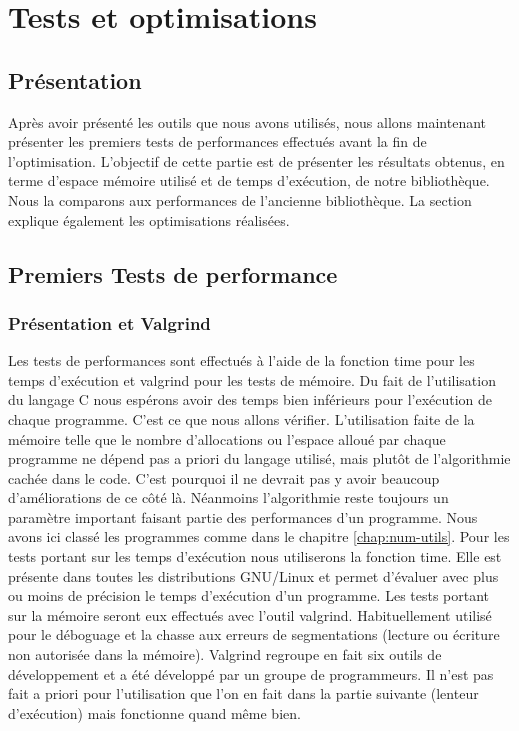 
\chapter{Tests et optimisations}
\label{chap:tests et optimisations}

\section{Pr\'esentation}

Apr\`es avoir pr\'esent\'e les outils que nous avons utilis\'es, nous allons maintenant pr\'esenter les premiers tests de performances effectu\'es 
avant la fin de l'optimisation.
L'objectif de cette partie est de pr\'esenter les r\'esultats obtenus, en terme d'espace m\'emoire utilis\'e et de temps d'ex\'ecution, de notre biblioth\`eque.
Nous la comparons aux performances de l'ancienne biblioth\`eque. La section explique \'egalement les optimisations r\'ealis\'ees.

\section{Premiers Tests de performance}

\subsection{Pr\'esentation et Valgrind}
Les tests de performances sont effectu\'es \`a l'aide de la fonction time pour les temps d'ex\'ecution et valgrind \citep{valgrind} pour les tests de m\'emoire.
Du fait de l'utilisation du langage C nous esp\'erons avoir des temps bien inf\'erieurs pour l'ex\'ecution de chaque programme. C'est ce que nous allons
 v\'erifier.
L'utilisation faite de la m\'emoire telle que le nombre d'allocations ou l'espace allou\'e par chaque programme ne d\'epend pas a priori du langage
 utilis\'e, mais plut\^ot de l'algorithmie cach\'ee dans le code. C'est pourquoi il ne devrait pas y avoir beaucoup d'am\'eliorations de ce c\^ot\'e l\`a.
N\'eanmoins l'algorithmie reste toujours un param\`etre important faisant partie des performances d'un programme.
Nous avons ici class\'e les programmes comme dans le chapitre \ref{chap:num-utils}.
Pour les tests portant sur les temps d'ex\'ecution nous utiliserons la fonction time. Elle est pr\'esente dans toutes les distributions GNU/Linux et permet d'\'evaluer avec plus ou moins de pr\'ecision le temps d'ex\'ecution d'un programme.
Les tests portant sur la m\'emoire seront eux effectu\'es avec l'outil valgrind. Habituellement utilis\'e pour le d\'eboguage et la chasse aux erreurs de segmentations (lecture ou \'ecriture non autoris\'ee dans la m\'emoire).
Valgrind regroupe en fait six outils de d\'eveloppement et a \'et\'e d\'evelopp\'e par un groupe de programmeurs. Il n'est pas fait a priori pour l'utilisation que l'on en fait dans la partie suivante (lenteur d'ex\'ecution) mais fonctionne quand m\^eme bien.
 

